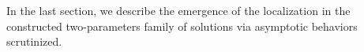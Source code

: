 \documentclass[a4paper,11pt]{article}
\theoremstyle{remark}
\begin{document}
In the last section, we describe the emergence of the localization in the constructed two-parameters family of solutions via asymptotic behaviors scrutinized.


%
%
\end{document}
